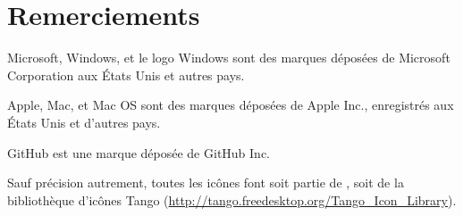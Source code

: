 
\chapter*{Remerciements}

Microsoft, Windows, et le logo Windows sont des marques déposées de Microsoft Corporation aux États Unis et autres pays.

Apple, Mac, et Mac OS sont des marques déposées de Apple Inc., enregistrés aux États Unis et d'autres pays.

GitHub est une marque déposée de GitHub Inc.

Sauf précision autrement, toutes les icônes font soit partie de \Tw, soit de la bibliothèque d'icônes Tango (\url{http://tango.freedesktop.org/Tango_Icon_Library}).

